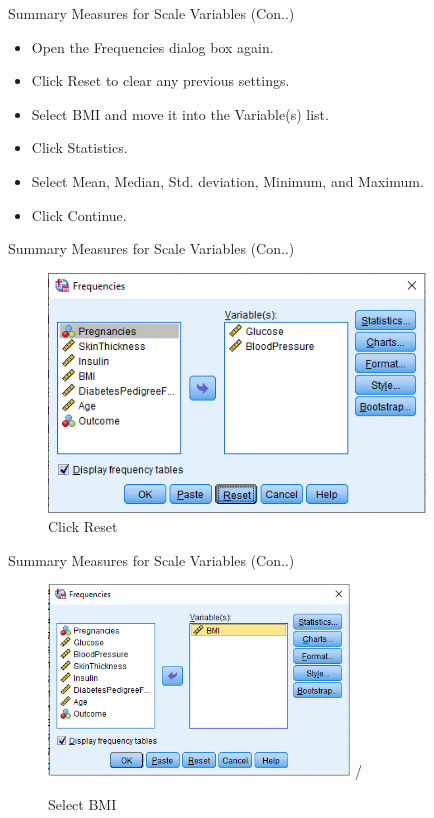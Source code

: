 \begin{frame}[t]{Summary Measures for Scale Variables (Con..)}
	\begin{itemize}
		\item Open the Frequencies dialog box again.
		\item Click Reset to clear any previous settings.
		\item Select BMI and move it into the Variable(s) list.
		\item Click Statistics.
		\item Select Mean, Median, Std. deviation, Minimum, and Maximum.
		\item Click Continue.
	\end{itemize}
\end{frame}
\begin{frame}[t]{Summary Measures for Scale Variables (Con..)}
	\begin{figure}
		\centering
		\includegraphics[width=10cm]{img/1111111}
		\caption{Click Reset}
	\end{figure}
\end{frame}
\begin{frame}[t]{Summary Measures for Scale Variables (Con..)}
	\begin{figure}
		\centering
		\includegraphics[width=8cm]{img/1111112}
		/
		\caption{Select BMI}
	\end{figure}
\end{frame}
